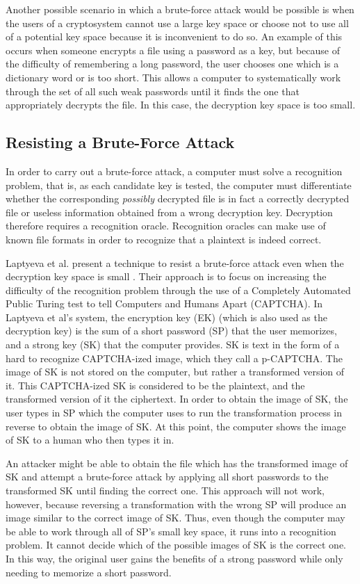 \documentclass[12pt]{article}
\begin{document}
Another possible scenario in which a brute-force attack would be possible is when the users of a cryptosystem cannot use a large key space or choose not to use all of a potential key space because it is inconvenient to do so. An example of this occurs when someone encrypts a file using a password as a key, but because of the difficulty of remembering a long password, the user chooses one which is a dictionary word or is too short. This allows a computer to systematically work through the set of all such weak passwords until it finds the one that appropriately decrypts the file. In this case, the decryption key space is too small.

\subsection*{Resisting a Brute-Force Attack}
In order to carry out a brute-force attack, a computer must solve a recognition problem, that is, as each candidate key is tested, the computer must differentiate whether the corresponding \emph{possibly} decrypted file is in fact a correctly decrypted file or useless information obtained from a wrong decryption key. Decryption therefore requires a recognition oracle. Recognition oracles can make use of known file formats in order to recognize that a plaintext is indeed correct.

Laptyeva et al. present a technique to resist a brute-force attack even when the decryption key space is small \cite{laptyeva}. Their approach is to focus on increasing the difficulty of the recognition problem through the use of a Completely Automated Public Turing test to tell Computers and Humans Apart (CAPTCHA). In Laptyeva et al's system, the encryption key (EK) (which is also used as the decryption key) is the sum of a short password (SP) that the user memorizes, and a strong key (SK) that the computer provides. SK is text in the form of a hard to recognize CAPTCHA-ized image, which they call a p-CAPTCHA. The image of SK is not stored on the computer, but rather a transformed version of it. This CAPTCHA-ized SK is considered to be the plaintext, and the transformed version of it the ciphertext. In order to obtain the image of SK, the user types in SP which the computer uses to run the transformation process in reverse to obtain the image of SK. At this point, the computer shows the image of SK to a human who then types it in.

An attacker might be able to obtain the file which has the transformed image of SK and attempt a brute-force attack by applying all short passwords to the transformed SK until finding the correct one. This approach will not work, however, because reversing a transformation with the wrong SP will produce an image similar to the correct image of SK. Thus, even though the computer may be able to work through all of SP's small key space, it runs into a recognition problem. It cannot decide which of the possible images of SK is the correct one. In this way, the original user gains the benefits of a strong password while only needing to memorize a short password.
\end{document}
